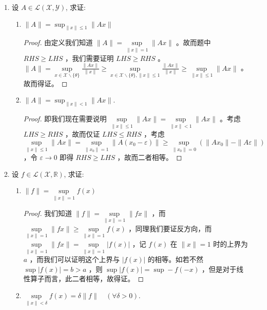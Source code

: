 \begin{enumerate}[leftmargin=2cm, label=\arabic*]
\begin{proof}
再说明必要性，若 $T\in\mathscr{L}(\mathscr{X},\ \mathscr{Y})$ ，则存在常数 $M\geqslant 0$ ，使得上式成立，故而对于 $\mathscr{X}$ 中任意有界集 $D$ ，$\|x\|_{\mathscr{X}} < \infty$ ，从而映射后的集合 $\|Tx\|_{\mathscr{Y}} < \infty$ ，故而映射为有界集。 
\end{proof}
    \item 设 $A \in \mathscr{L}(\mathscr{X}, \mathscr{Y})$, 求证:
    \begin{enumerate}[leftmargin=1cm, label=(\arabic*)]
        \item $\|A\|=\sup _{\|x\| \leqslant 1}\|A x\|$
\begin{proof}
    由定义我们知道 $\|A\| = \sup\limits_{\|x\| = 1} \|Ax\|$ 。故而题中 $RHS \geqslant LHS$ ，我们需要证明 $LHS\geqslant RHS$ 。$\|A\| = \sup\limits_{x\in\mathscr{X}\backslash\{\theta\}} \frac{\|Ax\|}{\|x\|} \geqslant \sup\limits_{x\in\mathscr{X}\backslash\{\theta\}, \|x\|\leqslant 1} \frac{\|Ax\|}{\|x\|} \geqslant \sup\limits_{\|x\|\leqslant 1} \|Ax\|$ 。故而得证。  
\end{proof}
        \item $\|A\|=\sup _{\|x\|<1}\|A x\|$.
\begin{proof}
    即我们现在需要说明 $\sup\limits_{\|x\| \leqslant 1} \|Ax\| = \sup\limits_{\|x\|<1} \|Ax\|$ 。考虑 $LHS \geqslant RHS$ ，故而仅证 $LHS \leqslant RHS$ ，考虑 $\sup\limits_{\|x\|\leqslant 1} \|Ax\| = \sup\limits_{\|x_0\| = 1} \|A(x_0 - \varepsilon)\| \geqslant \sup\limits_{\|x_0\| = 0} (\|Ax_0\| - \|A\varepsilon\|)$ ，令 $\varepsilon\to 0$ 即得 $RHS\geqslant LHS$ ，故而二者相等。 
\end{proof}
    \end{enumerate}
    \item 设 $f \in \mathscr{L}(\mathscr{X}, \mathbb{R})$, 求证:
    \begin{enumerate}[leftmargin=1cm, label=(\arabic*)]
        \item $\|f\|=\sup\limits_{\|x\|=1} f(x)$
\begin{proof}
    我们知道 $\|f\| = \sup\limits_{\|x\| = 1} \|fx\|$ ，而 $\sup\limits_{\|x\| = 1} \|fx\| \geqslant \sup\limits_{\|x\| = 1} f(x)$ ，同理我们要证反方向，而 $\sup\limits_{\|x\| = 1} \|fx\| = \sup\limits_{\|x\| = 1} |f(x)|$ ，记 $f(x)$ 在 $\|x\| = 1$ 时的上界为 $a$ ，而我们可以证明这个上界与 $|f(x)|$ 的相等。如若不然 $\sup |f(x)| = b > a$ ，则 $\sup |f(x)| = \sup - f(-x)$ ，但是对于线性算子而言，此二者相等，故得证。
\end{proof}
        \item $\sup\limits_{\|x\|<\delta} f(x)=\delta\|f\| \quad(\forall \delta>0)$.

\end{enumerate}
\end{enumerate}
